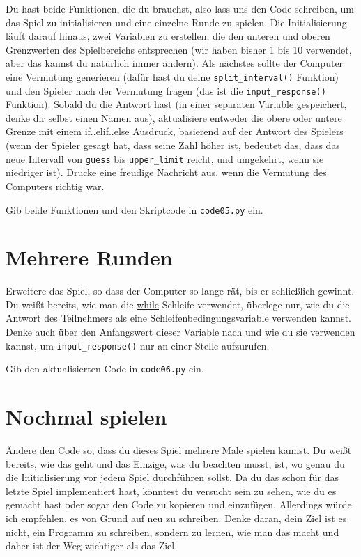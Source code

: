 \documentclass[
]{book}
\begin{document}
Du hast beide Funktionen, die du brauchst, also lass uns den Code schreiben, um das Spiel zu initialisieren und eine einzelne Runde zu spielen. Die Initialisierung läuft darauf hinaus, zwei Variablen zu erstellen, die den unteren und oberen Grenzwerten des Spielbereichs entsprechen (wir haben bisher 1 bis 10 verwendet, aber das kannst du natürlich immer ändern). Als nächstes sollte der Computer eine Vermutung generieren (dafür hast du deine \texttt{split\_interval()} Funktion) und den Spieler nach der Vermutung fragen (das ist die \texttt{input\_response()} Funktion). Sobald du die Antwort hast (in einer separaten Variable gespeichert, denke dir selbst einen Namen aus), aktualisiere entweder die obere oder untere Grenze mit einem \protect\hyperlink{if-statement}{if..elif..else} Ausdruck, basierend auf der Antwort des Spielers (wenn der Spieler gesagt hat, dass seine Zahl höher ist, bedeutet das, dass das neue Intervall von \texttt{guess} bis \texttt{upper\_limit} reicht, und umgekehrt, wenn sie niedriger ist). Drucke eine freudige Nachricht aus, wenn die Vermutung des Computers richtig war.

Gib beide Funktionen und den Skriptcode in \texttt{code05.py} ein.

\hypertarget{mehrere-runden}{%
\section{Mehrere Runden}\label{mehrere-runden}}

Erweitere das Spiel, so dass der Computer so lange rät, bis er schließlich gewinnt. Du weißt bereits, wie man die \protect\hyperlink{while-loop}{while} Schleife verwendet, überlege nur, wie du die Antwort des Teilnehmers als eine Schleifenbedingungsvariable verwenden kannst. Denke auch über den Anfangswert dieser Variable nach und wie du sie verwenden kannst, um \texttt{input\_response()} nur an einer Stelle aufzurufen.

Gib den aktualisierten Code in \texttt{code06.py} ein.

\hypertarget{nochmal-spielen}{%
\section{Nochmal spielen}\label{nochmal-spielen}}

Ändere den Code so, dass du dieses Spiel mehrere Male spielen kannst. Du weißt bereits, wie das geht und das Einzige, was du beachten musst, ist, wo genau du die Initialisierung vor jedem Spiel durchführen sollst. Da du das schon für das letzte Spiel implementiert hast, könntest du versucht sein zu sehen, wie du es gemacht hast oder sogar den Code zu kopieren und einzufügen. Allerdings würde ich empfehlen, es von Grund auf neu zu schreiben. Denke daran, dein Ziel ist es nicht, ein Programm zu schreiben, sondern zu lernen, wie man das macht und daher ist der Weg wichtiger als das Ziel.
\end{document}
